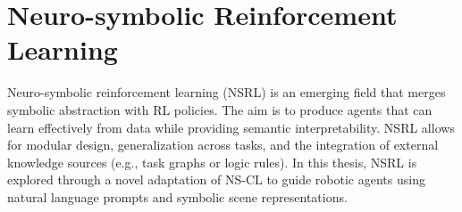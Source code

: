 \section{Neuro-symbolic Reinforcement Learning} \label{se:neurosymbolic_rl}
Neuro-symbolic reinforcement learning (NSRL) is an emerging field that merges symbolic abstraction with RL policies. The aim is to produce agents that can learn effectively from data while providing semantic interpretability. NSRL allows for modular design, generalization across tasks, and the integration of external knowledge sources (e.g., task graphs or logic rules). In this thesis, NSRL is explored through a novel adaptation of NS-CL to guide robotic agents using natural language prompts and symbolic scene representations.


